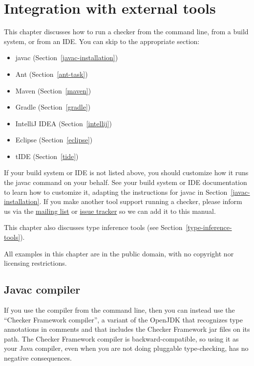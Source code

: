 \htmlhr
\chapter{Integration with external tools\label{external-tools}}

This chapter discusses how to run a checker from the command line, from a
build system, or from an IDE\@.  You can skip to the appropriate section:

\begin{itemize}
\item javac (Section~\ref{javac-installation})
\item Ant (Section~\ref{ant-task})
\item Maven (Section~\ref{maven})
\item Gradle (Section~\ref{gradle})
\item IntelliJ IDEA (Section~\ref{intellij})
\item Eclipse (Section~\ref{eclipse})
\item tIDE (Section~\ref{tide})
\end{itemize}

If your build system or IDE is not listed above, you should customize how
it runs the javac command on your behalf.  See your build system or IDE
documentation to learn how to
customize it, adapting the instructions for javac in Section~\ref{javac-installation}.
If you make another tool support running a checker, please
inform us via the
\href{http://groups.google.com/group/checker-framework-discuss}{mailing
  list} or
\href{https://github.com/typetools/checker-framework/issues}{issue tracker} so
we can add it to this manual.

This chapter also discusses type inference tools (see
Section~\ref{type-inference-tools}).

All examples in this chapter are in the public domain, with no copyright nor
licensing restrictions.


\section{Javac compiler\label{javac-installation}}

If you use the  compiler from the command line, then you can
instead use the ``Checker Framework compiler'', a variant of the OpenJDK
 that recognizes type annotations in comments and that includes
the Checker Framework jar files on its path.
The Checker Framework compiler is backward-compatible, so using it as your
Java compiler, even when you are not doing pluggable type-checking, has no
negative consequences.

